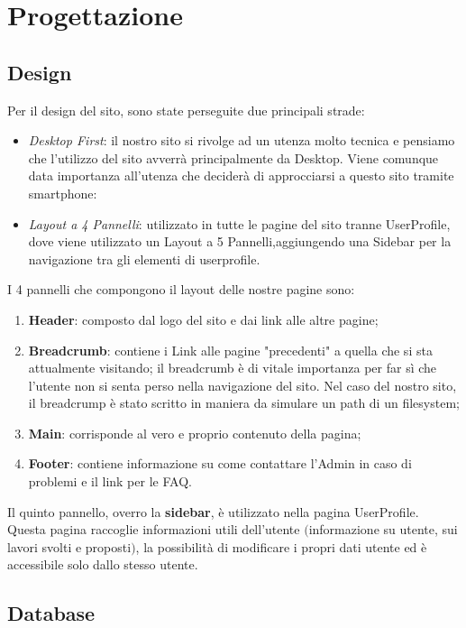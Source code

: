\section{Progettazione}
	
  \subsection{Design}
  Per il design del sito, sono state perseguite due principali strade:
  \begin{itemize}
    \item \textit{Desktop First}: il nostro sito si rivolge ad un utenza molto tecnica e pensiamo che l'utilizzo del sito avverrà principalmente da Desktop. Viene comunque data importanza all'utenza che deciderà di approcciarsi a questo sito tramite smartphone:
    \item \textit{Layout a 4 Pannelli}: utilizzato in tutte le pagine del sito tranne UserProfile, dove viene utilizzato un Layout a 5 Pannelli,aggiungendo una Sidebar per la navigazione tra gli elementi di userprofile.
  \end{itemize}
  
  I 4 pannelli che compongono il layout delle nostre pagine sono:
  \begin{enumerate}
    \item \textbf{Header}: composto dal logo del sito e dai link alle altre pagine;
    \item \textbf{Breadcrumb}: contiene i Link alle pagine "precedenti" a quella che si sta attualmente visitando; il breadcrumb è di vitale importanza per far sì che l'utente
      non si senta perso nella navigazione del sito. Nel caso del nostro sito, il breadcrump è stato scritto in maniera da simulare un path di un filesystem;
    \item \textbf{Main}: corrisponde al vero e proprio contenuto della pagina;
    \item \textbf{Footer}: contiene informazione su come contattare l'Admin in caso di problemi e il link per le FAQ.
  \end{enumerate}

  Il quinto pannello, overro la \textbf{sidebar}, è utilizzato nella pagina UserProfile. 
  Questa pagina raccoglie informazioni utili dell'utente $($informazione su utente, sui lavori svolti e proposti$)$, la possibilità di modificare i propri dati utente ed è accessibile solo dallo stesso utente.


  \subsection{Database}




